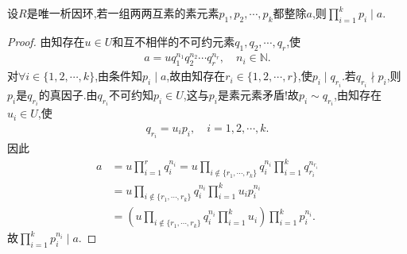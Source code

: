 \documentclass[../../main.tex]{subfiles}%
\begin{document}
\begin{proposition}\label{proposition:UFD中互素元素整除同一元素则乘积也整除这个元素}
设$R$是唯一析因环,若一组两两互素的素元素$p_1,p_2,\cdots,p_k$都整除$a$,则$\prod_{i=1}^k{p_i}\mid a.$
\end{proposition}
\begin{proof}
由知存在$u\in U$和互不相伴的不可约元素$q_1,q_2,\cdots,q_r$,使
\begin{align*}
a=uq_1^{n_1}q_2^{n_2}\cdots q_r^{n_r},\quad n_i\in \mathbb{N}.
\end{align*}
对$\forall i\in \{1,2,\cdots,k\}$,由条件知$p_i\mid a$,故由知存在$r_i\in \{1,2,\cdots,r\}$,使$p_i\mid q_{r_i}$.若$q_{r_i}\nmid p_i$,则$p_i$是$q_{r_i}$的真因子.由$q_{r_i}$不可约知$p_i\in U$,这与$p_i$是素元素矛盾!故$p_i\sim q_{r_i}$,由知存在$u_i\in U$,使
\begin{align*}
q_{r_i}=u_ip_i,\quad i=1,2,\cdots,k.
\end{align*}
因此
\begin{align*}
a&=u\prod_{i=1}^r q_i^{n_i}=u\prod_{i\notin \{r_1,\cdots,r_k\}} q_i^{n_i}\prod_{i=1}^k q_{r_i}^{n_{r_i}} \\
&=u\prod_{i\notin \{r_1,\cdots,r_k\}} q_i^{n_i}\prod_{i=1}^k u_ip_i^{n_i} \\
&=\left( u\prod_{i\notin \{r_1,\cdots,r_k\}} q_i^{n_i}\prod_{i=1}^k u_i \right) \prod_{i=1}^k p_i^{n_i}.
\end{align*}
故$\prod_{i=1}^k p_i^{n_i}\mid a$.
\end{proof}
\end{document}
